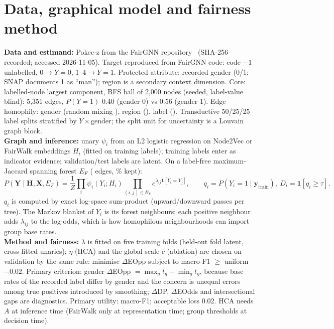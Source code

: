 \documentclass[11pt,a4paper]{article}
\begin{document}
\section{Data, graphical model and fairness method}
\textbf{Data and estimand:} Pokec-z from the FairGNN repository~\cite{fairgnn} (SHA-256 recorded; accessed 2026-11-05). Target reproduced from FairGNN code: code $-1$ unlabelled, $0\!\to\!Y{=}0$, $1$--$4\!\to\!Y{=}1$. Protected attribute: recorded gender (0/1; SNAP documents 1 as ``man''); region is a secondary context dimension. Core: labelled-node largest component, BFS ball of 2{,}000 nodes (seeded, label-value blind): 5{,}351 edges, $P(Y{=}1)$ 0.40 (gender 0) vs 0.56 (gender 1). Edge homophily: gender \RHomGender{} (random mixing \RHomGenderRand), region \RHomRegion{} (\RHomRegionRand), label \RHomLabel{} (\RHomLabelRand). Transductive 50/25/25 label splits stratified by $Y\times$gender; the split unit for uncertainty is a Louvain graph block.\\
\textbf{Graph and inference:} unary $\psi_i$ from an L2 logistic regression on Node2Vec or FairWalk embeddings $H_i$ (fitted on training labels); training labels enter as indicator evidence; validation/test labels are latent. On a label-free maximum-Jaccard spanning forest $E_F$ (\RForestEdges{} edges, \RForestKept\% kept):
\[
P(\mathbf Y\mid\mathbf H,\mathbf X,E_F)=\frac1Z\prod_i\psi_i(Y_i;H_i)\!\!\prod_{(i,j)\in E_F}\!\!e^{\lambda_{ij}\mathbf 1[Y_i=Y_j]},\qquad
q_i=P(Y_i{=}1\mid \mathbf y_{\mathrm{train}}),\ D_i=\mathbf 1[q_i\ge\tau].
\]
$q_i$ is computed by exact log-space sum-product (upward/downward passes per tree). The Markov blanket of $Y_i$ is its forest neighbours; each positive neighbour adds $\lambda_{ij}$ to the log-odds, which is how homophilous neighbourhoods can import group base rates.\\
\textbf{Method and fairness:} $\lambda$ is fitted on five training folds (held-out fold latent, cross-fitted unaries); $\eta$ (HCA) and the global scale $c$ (ablation) are chosen on validation by the same rule: minimise $\Delta$EOpp subject to macro-F1 $\ge$ uniform $-0.02$. Primary criterion: gender $\Delta$EOpp $=\max_g t_g-\min_g t_g$, because base rates of the recorded label differ by gender and the concern is unequal errors among true positives introduced by smoothing; $\Delta$DP, $\Delta$EOdds and intersectional gaps are diagnostics. Primary utility: macro-F1; acceptable loss 0.02. HCA needs $A$ at inference time (FairWalk only at representation time; group thresholds at decision time).
\end{document}
